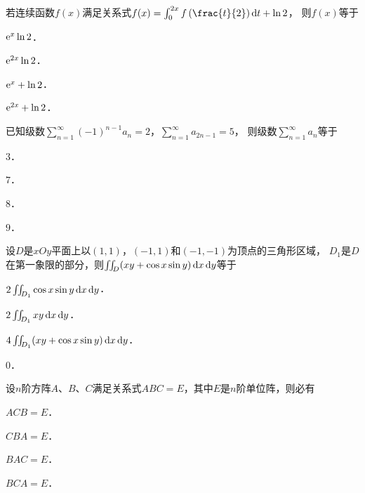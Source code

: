 \documentclass[plain,noanswer,medmath]{../../template/jnuexam}
\begin{document}
\begin{problem}
若连续函数$f(x)$满足关系式$f(x) = \int_0^{2x} f\left(\frac{t}{2} \right) \dt + \ln 2$，
则$f(x)$等于\pickout{}
\begin{abcd}
\item $\mathrm{e}^x\ln 2$．		
\item $\mathrm{e}^{2x}\ln 2$．		
\item $\mathrm{e}^x + \ln 2$．		
\item $\mathrm{e}^{2x} + \ln 2$．
\end{abcd}
\end{problem}


\begin{problem}
已知级数$\sum_{n = 1}^{\infty}(- 1)^{n - 1} a_n = 2$，$\sum_{n = 1}^{\infty}a_{2n - 1} = 5$，
则级数$\sum_{n = 1}^{\infty}a_n$等于\pickout{}
\begin{abcd}
\item $3$．			
\item $7$．			
\item $8$．			
\item $9$．
\end{abcd}
\end{problem}


\begin{problem}
设$D$是$xOy$平面上以$(1,1)$，$(- 1,1)$和$(- 1, - 1)$为顶点的三角形区域，
$D_1$是$D$在第一象限的部分，则$\iint_D (xy + \cos x\sin y)\mathop{}\!\mathrm{d} x\mathop{}\!\mathrm{d} y$等于\pickout{}
\begin{abcd}
\item $2\iint_{D_1} \cos x\sin y\mathop{}\!\mathrm{d} x\mathop{}\!\mathrm{d} y$．
\item $2\iint_{D_1} xy\mathop{}\!\mathrm{d} x\mathop{}\!\mathrm{d} y$．
\item $4\iint_{D_1} (xy + \cos x\sin y)\mathop{}\!\mathrm{d} x\mathop{}\!\mathrm{d} y$．
\item $0$．
\end{abcd}
\end{problem}


\begin{problem}
设$n$阶方阵$A$、$B$、$C$满足关系式$ABC = E$，其中$E$是$n$阶单位阵，则必有\pickout{}
\begin{abcd}
\item $ACB = E$．    
\item $CBA = E$．    
\item $BAC = E$．    
\item $BCA = E$．
\end{abcd}
\end{problem}


\end{document}
